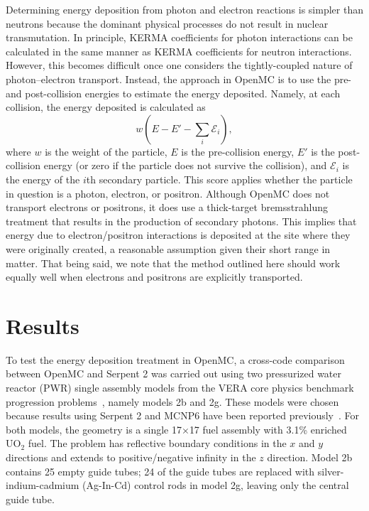 \documentclass{anstrans}
\begin{document}
Determining energy deposition from photon and electron reactions is simpler than
neutrons because the dominant physical processes do not result in nuclear
transmutation. In principle, KERMA coefficients for photon interactions can be
calculated in the same manner as KERMA coefficients for neutron interactions.
However, this becomes difficult once one considers the tightly-coupled nature of
photon--electron transport. Instead, the approach in OpenMC is to use the pre-
and post-collision energies to estimate the energy deposited. Namely, at each
collision, the energy deposited is calculated as
\begin{equation}
    w \left ( E - E' - \sum_i \mathcal{E}_i \right ),
\end{equation}
where $w$ is the weight of the particle, $E$ is the pre-collision energy, $E'$
is the post-collision energy (or zero if the particle does not survive the
collision), and $\mathcal{E}_i$ is the energy of the $i$th secondary particle.
This score applies whether the particle in question is a photon, electron, or
positron. Although OpenMC does not transport electrons or positrons, it does use
a thick-target bremsstrahlung treatment that results in the production of
secondary photons. This implies that energy due to electron/positron
interactions is deposited at the site where they were originally created, a
reasonable assumption given their short range in matter. That being said, we
note that the method outlined here should work equally well when electrons and
positrons are explicitly transported.

\section{Results}

To test the energy deposition treatment in OpenMC, a cross-code comparison
between OpenMC and Serpent 2 was carried out using two pressurized water reactor
(PWR) single assembly models from the VERA core physics benchmark progression
problems~\cite{godfrey2014casl}, namely models 2b and 2g. These models were
chosen because results using Serpent 2 and MCNP6 have been reported
previously~\cite{tuominen2019ane}. For both models, the geometry is a single
17$\times$17 fuel assembly with 3.1\% enriched UO$_2$ fuel. The problem has
reflective boundary conditions in the $x$ and $y$ directions and extends to
positive/negative infinity in the $z$ direction. Model 2b contains 25 empty
guide tubes; 24 of the guide tubes are replaced with silver-indium-cadmium
(Ag-In-Cd) control rods in model 2g, leaving only the central guide tube.
\end{document}
